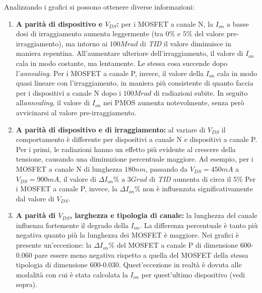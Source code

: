Analizzando i grafici si possono ottenere diverse informazioni:
\begin{enumerate}
    \item \textbf{A parità di dispositivo e $V_{DS}$:} per i MOSFET a canale N, la $I_{on}$ a basse dosi di irraggiamento aumenta leggermente (tra $0\%$ e $5\%$ del valore pre-irraggiamento), ma intorno ai $100 Mrad$ di \emph{TID} il valore diminuisce in maniera repentina. All'aumentare ulteriore dell'irraggiamento, il valore di $I_{on}$ cala in modo costante, ma lentamente. Le stessa cosa succende dopo l'\emph{annealing}. Per i MOSFET a canale P, invece, il valore della $I_{on}$ cala in modo quasi lineare con l'irraggiamento, in maniera più consistente di quanto faccia per i dispositivi a canale N dopo i $100 Mrad$ di radiazioni subite. In seguito all\emph{annealing}, il valore di $I_{on}$ nei PMOS aumenta notevolmente, senza però avvicinarsi al valore pre-irraggiamento.
	\item \textbf{A parità di dispositivo e di irraggiamento:} al variare di $V_{DS}$ il comportamento è differente per dispositivi a canale N e dispositivi a canale P. Per i primi, le radiazioni hanno un effetto più evidente al crescere della tensione, causando una diminuzione percentuale maggiore. Ad esempio, per i MOSFET a canale N di lunghezza $180 nm$, passando da $V_{DS} = 450mA$ a $V_{DS} = 900 mA$, il valore di $\Delta I_{on}\%$ a $3 Grad$ di \emph{TID} aumenta di circa il $5\%$ Per i MOSFET a canale P, invece, la $\Delta I_{on}\%$ non è influenzata significativamente dal valore di $V_{DS}$.
	 \item \textbf{A parità di $V_{DS}$, larghezza e tipologia di canale:} la lunghezza del canale influenza fortemente il degrado della $I_{on}$. La differenza percentuale è tanto più negativa quanto più la lunghezza dei MOSFET è maggiore. Nei grafici è presente un'eccezione: la $\Delta I_{on}\%$ del MOSFET a canale P di dimensione 600-0.060 pare essere meno negativa rispetto a quella del MOSFET della stessa tipologia di dimensione 600-0.030. Quest'eccezione in realtà è dovuta alle modalità con cui è stata calcolata la $I_{on}$ per quest'ultimo dispositivo (vedi sopra).

\end{enumerate}


